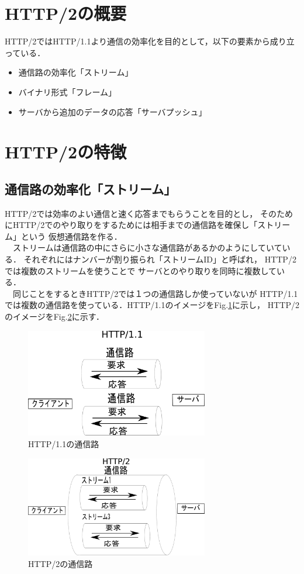 \documentclass[a4j,9pt,twocolumn]{jsarticle}
\begin{document}
\section{HTTP/2の概要}
HTTP/2ではHTTP/1.1より通信の効率化を目的として，以下の要素から成り立っている．

\begin{itemize}
 \item 通信路の効率化「ストリーム」
 \item バイナリ形式「フレーム」
 \item サーバから追加のデータの応答「サーバプッシュ」
\end{itemize}



\section{HTTP/2の特徴}
\subsection{通信路の効率化「ストリーム」}
HTTP/2では効率のよい通信と速く応答までもらうことを目的とし，
そのためにHTTP/2でのやり取りをするためには相手までの通信路を確保し「ストリーム」という
仮想通信路を作る．
\\　ストリームは通信路の中にさらに小さな通信路があるかのようにしていている．
それぞれにはナンバーが割り振られ「ストリームID」と呼ばれ，
HTTP/2では複数のストリームを使うことで
サーバとのやり取りを同時に複数している．
\\　同じことをするときHTTP/2では１つの通信路しか使っていないが
HTTP/1.1では複数の通信路を使っている．HTTP/1.1のイメージをFig.\ref{HTTP1.1}に示し，
HTTP/2のイメージをFig.\ref{HTTP200}に示す．


\begin{figure}[h]
\centering
\includegraphics[width=80mm]{img/TCPco5.eps}
\caption{HTTP/1.1の通信路}
\label{HTTP1.1}
\end{figure}




\begin{figure}[h]
\centering
\includegraphics[width=80mm]{img/TCPco6.eps}
\caption{HTTP/2の通信路}
\label{HTTP200}
\end{figure}
\end{document}
